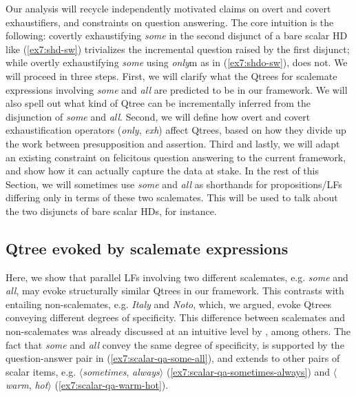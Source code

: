 Our analysis will recycle independently motivated claims on overt and covert exhaustifiers, and constraints on question answering. The core intuition is the following: covertly exhaustifying \textit{some} in the second disjunct of a bare scalar HD like (\ref{ex7:shd-sw}) trivializes the incremental question raised by the first disjunct; while overtly exhaustifying \textit{some} using \textit{only}m as in (\ref{ex7:shdo-sw}), does not. %
We will proceed in three steps. First, we will clarify what the Qtrees for scalemate expressions involving \textit{some} and \textit{all} are predicted to be in our framework. We will also spell out what kind of Qtree can be incrementally inferred from the disjunction of \textit{some} and \textit{all}. Second, we will define how overt and covert exhaustification operators (\textit{only}, \textit{exh}) affect Qtrees, based on how they divide up the work between presupposition and assertion. Third and lastly, we will adapt an existing constraint on felicitous question answering to the current framework, and show how it can actually capture the data at stake. In the rest of this Section, we will sometimes use \textit{some} and \textit{all} as shorthands for propositions/LFs differing only in terms of these two scalemates. This will be used to talk about the two disjuncts of bare scalar HDs, for instance.

\subsection{Qtree evoked by scalemate expressions}

Here, we show that parallel LFs involving two different scalemates, e.g. \textit{some} and \textit{all}, may evoke structurally similar Qtrees in our framework. This contrasts with entailing non-scalemates, e.g. \textit{Italy} and \textit{Noto}, which, we argued, evoke Qtrees conveying different degrees of specificity. This difference between scalemates and non-scalemates was already discussed at an intuitive level by \citet{Westera2018}, among others. The fact that \textit{some} and \textit{all} convey the same degree of specificity, is supported by the question-answer pair in (\ref{ex7:scalar-qa-some-all}), and extends to other pairs of scalar items, e.g. $\langle$\textit{sometimes}, \textit{always}$\rangle$ (\ref{ex7:scalar-qa-sometimes-always}) and $\langle$\textit{warm}, \textit{hot}$\rangle$ (\ref{ex7:scalar-qa-warm-hot}).

